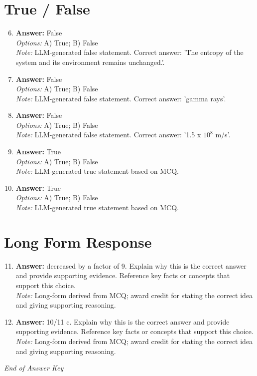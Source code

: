 \documentclass[12pt]{article}
\begin{document}
\section*{True / False}
\begin{enumerate}[label=\arabic*.]
\setcounter{enumi}{5}
\item \textbf{Answer:} False
\\ \textit{Options:} A) True; B) False
\\ \textit{Note:} LLM-generated false statement. Correct answer: 'The entropy of the system and its environment remains unchanged.'.
\item \textbf{Answer:} False
\\ \textit{Options:} A) True; B) False
\\ \textit{Note:} LLM-generated false statement. Correct answer: 'gamma rays'.
\item \textbf{Answer:} False
\\ \textit{Options:} A) True; B) False
\\ \textit{Note:} LLM-generated false statement. Correct answer: '1.5 x $10^8$ m/s'.
\item \textbf{Answer:} True
\\ \textit{Options:} A) True; B) False
\\ \textit{Note:} LLM-generated true statement based on MCQ.
\item \textbf{Answer:} True
\\ \textit{Options:} A) True; B) False
\\ \textit{Note:} LLM-generated true statement based on MCQ.
\end{enumerate}

\section*{Long Form Response}
\begin{enumerate}[label=\arabic*.]
\setcounter{enumi}{10}
\item \textbf{Answer:} decreased by a factor of 9. Explain why this is the correct answer and provide supporting evidence. Reference key facts or concepts that support this choice.
\\ \textit{Note:} Long-form derived from MCQ; award credit for stating the correct idea and giving supporting reasoning.
\item \textbf{Answer:} 10/11 c. Explain why this is the correct answer and provide supporting evidence. Reference key facts or concepts that support this choice.
\\ \textit{Note:} Long-form derived from MCQ; award credit for stating the correct idea and giving supporting reasoning.
\end{enumerate}

\vfill
\noindent\textit{End of Answer Key}
\end{document}
